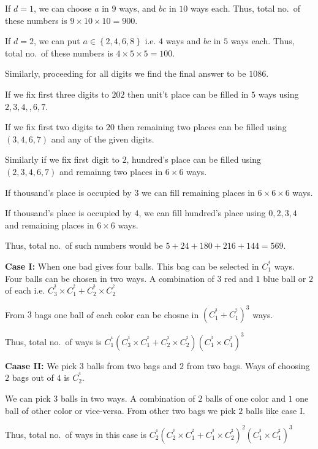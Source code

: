   If $d = 1$, we can choose $a$ in $9$ ways, and $bc$ in $10$ ways each. Thus, total no.\ of these numbers
  is $9\times10\times10 = 900$.

  If $d = 2$, we can put $a\in\left\{2, 4, 6, 8\right\}$ i.e. $4$ ways and $bc$ in $5$ ways each. Thus,
  total no.\ of these numbers is $4\times5\times5 = 100$.

  Similarly, proceeding for all digits we find the final answer to be $1086$.
\item If we fix first three digits to $202$ then unit't place can be filled in $5$ ways using $2, 3, 4, ,6,
  7$.

  If we fix first two digits to $20$ then remaining two places can be filled using $(3, 4, 6, 7)$ and any of
  the given digits.

  Similarly if we fix first digit to $2$, hundred's place can be filled using $(2, 3, 4, 6, 7)$ and remainng
  two places in $6\times 6$ ways.

  If thousand's place is occupied by $3$ we can fill remaining places in $6\times6\times6$ ways.

  If thousand's place is occupied by $4$, we can fill hundred's place using $0, 2, 3, 4$ and remaining
  places in $6\times6$ ways.

  Thus, total no.\ of such numbers would be $5 + 24 + 180 + 216 + 144 = 569$.
\item {\bf Case I:} When one bad gives four balls. This bag can be selected in $C_1^^4$ ways. Four balls can
  be chosen in two ways. A combination of $3$ red and $1$ blue ball or $2$ of each i.e. $C_3^^3\times C_1^^2
  + C_2^^3\times C_2^^2$

  From $3$ bags one ball of each color can be chosne in $\left(C_1^^3 + C_1^^2\right)^3$ ways.

  Thus, total no.\ of ways is $C_1^^4\left(C_3^^3\times C_1^^2 + C_2^^3\times C_2^^2\right)\left(C_1^^3\times
  C_1^^2\right)^3$

  {\bf Caase II:} We pick $3$ balls from two bags and $2$ from two bags. Ways of choosing $2$ bags out of
  $4$ is $C_2^^4$.

  We can pick $3$ balls in two ways. A combination of $2$ balls of one color and $1$ one ball of other color
  or vice-versa. From other two bags we pick $2$ balls like case I.

  Thus, total no.\ of ways in this case is $C_2^^4\left(C_2^^3\times C_1^^2 + C_1^^3\times
  C_2^^2\right)^2\left(C_1^^3\times C_1^^2\right)^3$

